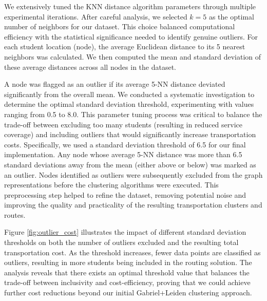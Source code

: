 We extensively tuned the KNN distance algorithm parameters through multiple experimental iterations. After careful analysis, we selected $k=5$ as the optimal number of neighbors for our dataset. This choice balanced computational efficiency with the statistical significance needed to identify genuine outliers. For each student location (node), the average Euclidean distance to its 5 nearest neighbors was calculated. We then computed the mean and standard deviation of these average distances across all nodes in the dataset.

A node was flagged as an outlier if its average 5-NN distance deviated significantly from the overall mean. We conducted a systematic investigation to determine the optimal standard deviation threshold, experimenting with values ranging from 0.5 to 8.0. This parameter tuning process was critical to balance the trade-off between excluding too many students (resulting in reduced service coverage) and including outliers that would significantly increase transportation costs. Specifically, we used a standard deviation threshold of 6.5 for our final implementation. Any node whose average 5-NN distance was more than 6.5 standard deviations away from the mean (either above or below) was marked as an outlier. Nodes identified as outliers were subsequently excluded from the graph representations before the clustering algorithms were executed. This preprocessing step helped to refine the dataset, removing potential noise and improving the quality and practicality of the resulting transportation clusters and routes.

Figure \ref{fig:outlier_cost} illustrates the impact of different standard deviation thresholds on both the number of outliers excluded and the resulting total transportation cost. As the threshold increases, fewer data points are classified as outliers, resulting in more students being included in the routing solution. The analysis reveals that there exists an optimal threshold value that balances the trade-off between inclusivity and cost-efficiency, proving that we could achieve further cost reductions beyond our initial Gabriel+Leiden clustering approach.

